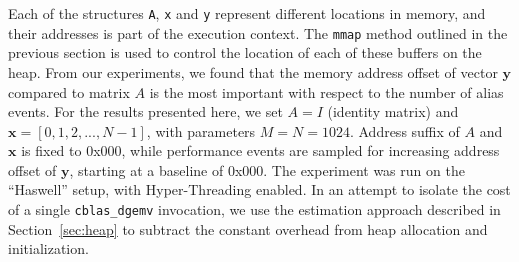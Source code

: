\documentclass{acm_proc_article-sp}
\begin{document}
Each of the structures \texttt{A}, \texttt{x} and \texttt{y} represent different locations in memory, and their addresses is part of the execution context.
The \texttt{mmap} method outlined in the previous section is used to control the location of each of these buffers on the heap.
From our experiments, we found that the memory address offset of vector $\boldsymbol{y}$ compared to matrix $A$ is the most important with respect to the number of alias events.
For the results presented here, we set $A = I$ (identity matrix) and $\boldsymbol{x} = [0, 1, 2, ..., N-1]$, with parameters $M = N = 1024$.
Address suffix of $A$ and $\boldsymbol{x}$ is fixed to 0x000, while performance events are sampled for increasing address offset of $\boldsymbol{y}$, starting at a baseline of 0x000.
The experiment was run on the ``Haswell'' setup, with Hyper-Threading enabled.
In an attempt to isolate the cost of a single \texttt{cblas_dgemv} invocation, we use the estimation approach described in Section~\ref{sec:heap} to subtract the constant overhead from heap allocation and initialization.
\end{document}
